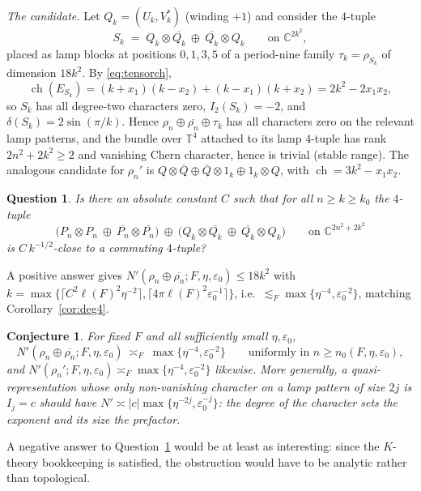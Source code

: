 \documentclass[11pt]{amsart}
\newtheorem{conjecture}[theorem]{Conjecture}
\newtheorem{question}[theorem]{Question}
\theoremstyle{definition}
\theoremstyle{remark}
\newcommand{\C}{\mathbb C}
\newcommand{\T}{\mathbb T}
\newcommand{\ch}{\operatorname{ch}}
\begin{document}
\emph{The candidate.} Let $Q_k=(U_k,V_k^*)$ (winding $+1$) and consider the $4$-tuple
\begin{equation}\label{eq:candidate}
S_k\;=\;Q_k\otimes\overline{Q_k}\ \oplus\ \overline{Q_k}\otimes Q_k\qquad\text{on }\C^{2k^2},
\end{equation}
placed as lamp blocks at positions $0,1,3,5$ of a period-nine family $\tau_k=\rho_{S_k}$ of dimension $18k^2$. By \eqref{eq:tensorch},
\[
\ch(E_{S_k})=(k+x_1)(k-x_2)+(k-x_1)(k+x_2)=2k^2-2x_1x_2 ,
\]
so $S_k$ has all degree-two characters zero, $I_2(S_k)=-2$, and $\delta(S_k)=2\sin(\pi/k)$. Hence $\rho_n\oplus\overline{\rho_n}\oplus\tau_k$ has all characters zero on the relevant lamp patterns, and the bundle over $\T^4$ attached to its lamp $4$-tuple has rank $2n^2+2k^2\ge2$ and vanishing Chern character, hence is trivial (stable range). The analogous candidate for $\rho_n'$ is $Q\otimes\overline Q\oplus\overline Q\otimes1_k\oplus1_k\otimes Q$, with $\ch=3k^2-x_1x_2$.

\begin{question}\label{q:2d}
Is there an absolute constant $C$ such that for all $n\ge k\ge k_0$ the $4$-tuple
\[
\bigl(P_n\otimes P_n\ \oplus\ \overline{P_n}\otimes\overline{P_n}\bigr)\ \oplus\ \bigl(Q_k\otimes\overline{Q_k}\ \oplus\ \overline{Q_k}\otimes Q_k\bigr)\qquad\text{on }\C^{2n^2+2k^2}
\]
is $C\,k^{-1/2}$-close to a commuting $4$-tuple?
\end{question}

A positive answer gives $N'(\rho_n\oplus\overline{\rho_n};F,\eta,\varepsilon_0)\le18k^2$ with $k=\max\{\lceil C^2\ell(F)^2\eta^{-2}\rceil,\lceil4\pi\ell(F)^2\varepsilon_0^{-1}\rceil\}$, i.e.\ $\lesssim_F\max\{\eta^{-4},\varepsilon_0^{-2}\}$, matching Corollary~\ref{cor:deg4}.

\begin{conjecture}\label{conj:deg4}
For fixed $F$ and all sufficiently small $\eta,\varepsilon_0$,
\[
N'(\rho_n\oplus\overline{\rho_n};F,\eta,\varepsilon_0)\ \asymp_F\ \max\{\eta^{-4},\varepsilon_0^{-2}\}\qquad\text{uniformly in }n\ge n_0(F,\eta,\varepsilon_0),
\]
and $N'(\rho_n';F,\eta,\varepsilon_0)\asymp_F\max\{\eta^{-4},\varepsilon_0^{-2}\}$ likewise. More generally, a quasi-representation whose only non-vanishing character on a lamp pattern of size $2j$ is $I_j=c$ should have $N'\asymp|c|\max\{\eta^{-2j},\varepsilon_0^{-j}\}$: the degree of the character sets the exponent and its size the prefactor.
\end{conjecture}

A negative answer to Question~\ref{q:2d} would be at least as interesting: since the $K$-theory bookkeeping is satisfied, the obstruction would have to be analytic rather than topological.
\end{document}
